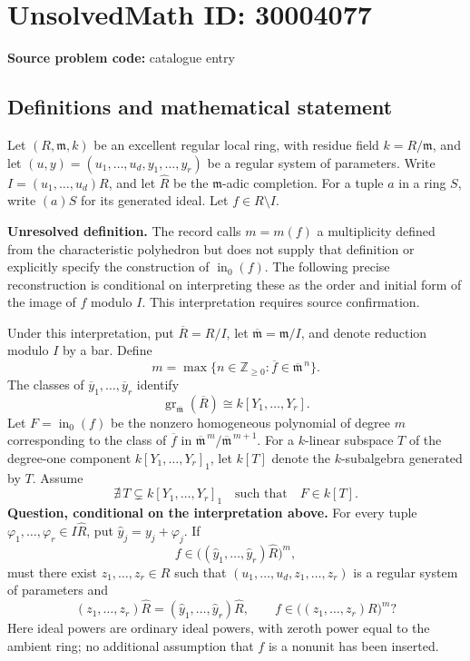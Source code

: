 \documentclass[11pt]{article}
\newcommand{\Z}{\mathbb{Z}}
\begin{document}
\section*{UnsolvedMath ID: 30004077}
\textbf{Source problem code:} catalogue entry
\subsection{Definitions and mathematical statement}
Let \((R,\mathfrak m,k)\) be an excellent regular local ring, with residue field \(k=R/\mathfrak m\), and let \((u,y)=(u_1,\ldots,u_d,y_1,\ldots,y_r)\) be a regular system of parameters. Write \(I=(u_1,\ldots,u_d)R\), and let \(\widehat R\) be the \(\mathfrak m\)-adic completion. For a tuple \(a\) in a ring \(S\), write \((a)S\) for its generated ideal. Let \(f\in R\setminus I\).

\textbf{Unresolved definition.} The record calls \(m=m(f)\) a multiplicity defined from the characteristic polyhedron but does not supply that definition or explicitly specify the construction of \(\operatorname{in}_0(f)\). The following precise reconstruction is conditional on interpreting these as the order and initial form of the image of \(f\) modulo \(I\). This interpretation requires source confirmation.

Under this interpretation, put \(\overline R=R/I\), let \(\overline{\mathfrak m}=\mathfrak m/I\), and denote reduction modulo \(I\) by a bar. Define
\[
 m=\max\{n\in\Z_{\geq0}:\overline f\in\overline{\mathfrak m}^{\,n}\}.
\]
The classes of \(\overline y_1,\ldots,\overline y_r\) identify
\[
 \operatorname{gr}_{\overline{\mathfrak m}}(\overline R)
 \cong k[Y_1,\ldots,Y_r].
\]
Let \(F=\operatorname{in}_0(f)\) be the nonzero homogeneous polynomial of degree \(m\) corresponding to the class of \(\overline f\) in \(\overline{\mathfrak m}^{\,m}/\overline{\mathfrak m}^{\,m+1}\). For a \(k\)-linear subspace \(T\) of the degree-one component \(k[Y_1,\ldots,Y_r]_1\), let \(k[T]\) denote the \(k\)-subalgebra generated by \(T\). Assume
\[
 \nexists\,T\subsetneq k[Y_1,\ldots,Y_r]_1
 \quad\text{such that}\quad F\in k[T].
\]
\textbf{Question, conditional on the interpretation above.} For every tuple \(\varphi_1,\ldots,\varphi_r\in I\widehat R\), put \(\widehat y_j=y_j+\varphi_j\). If
\[
 f\in\bigl((\widehat y_1,\ldots,\widehat y_r)\widehat R\bigr)^m,
\]
must there exist \(z_1,\ldots,z_r\in R\) such that \((u_1,\ldots,u_d,z_1,\ldots,z_r)\) is a regular system of parameters and
\[
 (z_1,\ldots,z_r)\widehat R
   =(\widehat y_1,\ldots,\widehat y_r)\widehat R,
 \qquad
 f\in\bigl((z_1,\ldots,z_r)R\bigr)^m?
\]
Here ideal powers are ordinary ideal powers, with zeroth power equal to the ambient ring; no additional assumption that \(f\) is a nonunit has been inserted.
\end{document}
